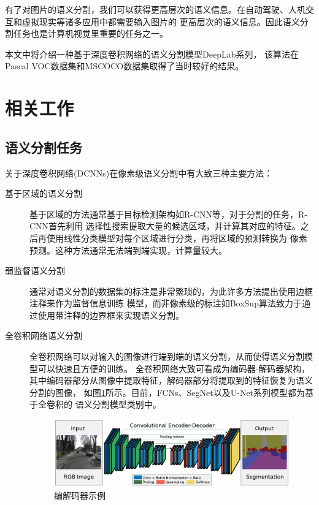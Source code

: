 \documentclass[10pt, a4paper]{article}
\begin{document}
有了对图片的语义分割，我们可以获得更高层次的语义信息。在自动驾驶、人机交互和虚拟现实等诸多应用中都需要输入图片的
更高层次的语义信息。因此语义分割任务也是计算机视觉里重要的任务之一。

本文中将介绍一种基于深度卷积网络的语义分割模型DeepLab\cite{Deeplab1,Deeplab2,Deeplab3}系列，
该算法在Pascal VOC数据集\cite{VOC}和MSCOCO数据集\cite{COCO}取得了当时较好的结果。

\section{相关工作}
\subsection{语义分割任务}
关于深度卷积网络(DCNNs)在像素级语义分割中有大致三种主要方法：

\begin{description}
    \item[基于区域的语义分割] 基于区域的方法通常基于目标检测架构如R-CNN\cite{RCNN}等，对于分割的任务，R-CNN首先利用
    选择性搜索提取大量的候选区域，并计算其对应的特征。之后再使用线性分类模型对每个区域进行分类，再将区域的预测转换为
    像素预测。这种方法通常无法端到端实现，计算量较大。
    \item[弱监督语义分割] 通常对语义分割的数据集的标注是非常繁琐的，为此许多方法提出使用边框注释来作为监督信息训练
    模型，而非像素级的标注如BoxSup\cite{BoxSup}算法致力于通过使用带注释的边界框来实现语义分割。
    \item[全卷积网络语义分割] 全卷积网络可以对输入的图像进行端到端的语义分割，从而使得语义分割模型可以快速且方便的训练。
    全卷积网络大致可看成为编码器-解码器架构，其中编码器部分从图像中提取特征，解码器部分将提取到的特征恢复为语义分割的图像，
    如图\ref{p1}所示。目前，FCNs\cite{FCN}、SegNet\cite{SegNet}以及U-Net\cite{UNet}系列模型都为基于全卷积的
    语义分割模型类别中。

    \begin{figure}[htbp]
        \centering
        \includegraphics[width=\textwidth]{p1.eps}
        \caption{编解码器示例\cite{SegNet}}
        \label{p1}
    \end{figure}
\end{description}
\end{document}

